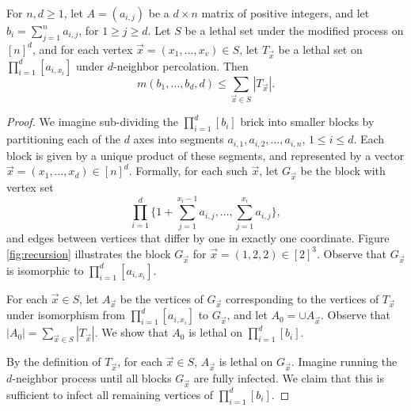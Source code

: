\begin{lem}
\label{lem:recursion}
For $n,d \geq 1$, let $A = (a_{i,j})$ be a $d \times n$ matrix of positive integers, and let $b_i = \sum_{j=1}^n a_{i,j}$, for $1 \geq j \geq d$. Let $S$ be a lethal set under the modified process on $[n]^d$, and for each vertex $\vec{x} = (x_1, \dots, x_v) \in S$, let $T_{\vec{x}}$ be a lethal set on $\prod_{i=1}^d [a_{i,x_i}]$ under $d$-neighbor percolation. Then
$$m(b_1, \dots, b_d, d) \leq \sum_{\vec{x} \in S} |T_{\vec{x}}|.$$
\end{lem}

\begin{proof}
We imagine sub-dividing the $\prod_{i=1}^d [b_{i}]$ brick into smaller blocks by partitioning each of the $d$ axes into segments $a_{i,1}, a_{i,2}, \dots, a_{i,n}$, $1 \leq i \leq d$. Each block is given by a unique product of these segments, and represented by a vector $\vec{x} = (x_1, \dots, x_d) \in [n]^d$. Formally, for each such $\vec{x}$, let $G_{\vec{x}}$ be the block with vertex set
$$\prod_{i=1}^d \{1+ \sum_{j=1}^{x_i -1}a_{i,j}, \dots, \sum_{j=1}^{x_i}a_{i,j} \},$$
and edges between vertices that differ by one in exactly one coordinate. Figure \ref{fig:recursion} illustrates the block $G_{\vec{x}}$ for $\vec{x} = (1,2,2) \in [2]^3$. Observe that $G_{\vec{x}}$ is isomorphic to $\prod_{i=1}^d [a_{i,x_i}]$.

For each $\vec{x} \in S$, let $A_{\vec{x}}$ be the vertices of $G_{\vec{x}}$ corresponding to the vertices of $T_{\vec{x}}$ under isomorphism from $\prod_{i=1}^d [a_{i,x_i}]$ to $G_{\vec{x}}$, and let $A_0 = \cup A_{\vec{x}}$. Observe that $|A_0| = \sum_{\vec{x} \in S} |T_{\vec{x}}|$. We show that $A_0$ is lethal on $\prod_{i=1}^d [b_{i}]$.

By the definition of $T_{\vec{x}}$, for each $\vec{x} \in S$, $A_{\vec{x}}$ is lethal on $G_{\vec{x}}$. Imagine running the $d$-neighbor process until all blocks $G_{\vec{x}}$ are fully infected. We claim that this is sufficient to infect all remaining vertices of $\prod_{i=1}^d [b_{i}]$. 
\end{proof}



